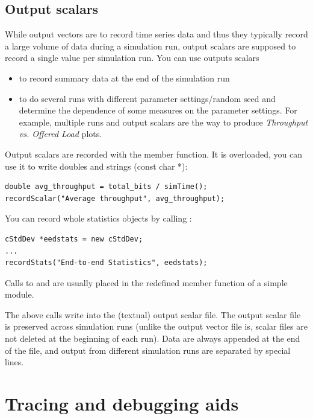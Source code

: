 \subsection{Output scalars}

While output vectors are to record time series data and thus they
typically record a large volume of data during a simulation run,
output scalars are supposed to record a single
value per simulation run. You can use outputs scalars
\begin{itemize}
\item{to record summary data at the end of the simulation run}
\item{to do several runs with different parameter settings/random seed
    and determine the dependence of some measures on the parameter
    settings. For example, multiple runs and output scalars are the
    way to produce \textit{Throughput vs. Offered Load} plots.}
\end{itemize}

Output scalars are recorded with the  member
function.  It is overloaded, you can use it to write doubles and
strings (const char *):

\begin{verbatim}
double avg_throughput = total_bits / simTime();
recordScalar("Average throughput", avg_throughput);
\end{verbatim}

You can record whole statistics objects by calling :

\begin{verbatim}
cStdDev *eedstats = new cStdDev;
...
recordStats("End-to-end Statistics", eedstats);
\end{verbatim}

Calls to  and  are usually
placed in the redefined  member function of a
simple module.

The above calls write into the (textual) output scalar file.  The
output scalar file is preserved across simulation runs (unlike the
output vector file is, scalar files are not deleted at the beginning
of each run). Data are always appended at the end of the file, and
output from different simulation runs are separated by special lines.




\section{Tracing and debugging aids}

